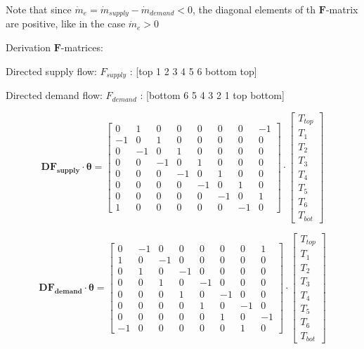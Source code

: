 \begin{scriptsize}
	Note that since $\dot{m}_e = \dot{m}_{supply} - \dot{m}_{demand} < 0$, the diagonal elements of th $\mathbf{F}$-matrix are positive, like in the case $\dot{m}_e > 0$
	
	Derivation $\mathbf{F}$-matrices:
	
	Directed supply flow: $F_{supply}$ : [top 1 2 3 4 5 6 bottom top]
	
	Directed demand flow: $F_{demand}$ : [bottom 6 5 4 3 2 1 top bottom]
	
	\begin{equation}
		\mathbf{DF_{supply}} \cdot \boldsymbol{\theta} =
		\begin{bmatrix}
			0 & 1 & 0 & 0 & 0 & 0 & 0 & -1 \\
			-1 & 0 & 1 & 0 & 0 & 0 & 0 & 0 \\
			0 & -1 & 0 & 1 & 0 & 0 & 0 & 0 \\
			0 & 0 & -1 & 0 & 1 & 0 & 0 & 0 \\
			0 & 0 & 0 & -1 & 0 & 1 & 0 & 0 \\
			0 & 0 & 0 & 0 & -1 & 0 & 1 & 0 \\
			0 & 0 & 0 & 0 & 0 & -1 & 0 & 1 \\
			1 & 0 & 0 & 0 & 0 & 0 & -1 & 0
		\end{bmatrix}
		\cdot
		\begin{bmatrix}
			T_{top} \\
			T_{1} \\
			T_{2} \\
			T_{3} \\
			T_{4} \\
			T_{5} \\
			T_{6} \\
			T_{bot}
		\end{bmatrix}
	\end{equation}
	
	\begin{equation}
		\mathbf{DF_{demand}} \cdot \boldsymbol{\theta} =
		\begin{bmatrix}
			0 & -1 & 0 & 0 & 0 & 0 & 0 & 1 \\
			1 & 0 & -1 & 0 & 0 & 0 & 0 & 0 \\
			0 & 1 & 0 & -1 & 0 & 0 & 0 & 0 \\
			0 & 0 & 1 & 0 & -1 & 0 & 0 & 0 \\
			0 & 0 & 0 & 1 & 0 & -1 & 0 & 0 \\
			0 & 0 & 0 & 0 & 1 & 0 & -1 & 0 \\
			0 & 0 & 0 & 0 & 0 & 1 & 0 & -1 \\
			-1 & 0 & 0 & 0 & 0 & 0 & 1 & 0
		\end{bmatrix}
		\cdot
		\begin{bmatrix}
			T_{top} \\
			T_{1} \\
			T_{2} \\
			T_{3} \\
			T_{4} \\
			T_{5} \\
			T_{6} \\
			T_{bot}
		\end{bmatrix}
	\end{equation}
	

\end{scriptsize}
